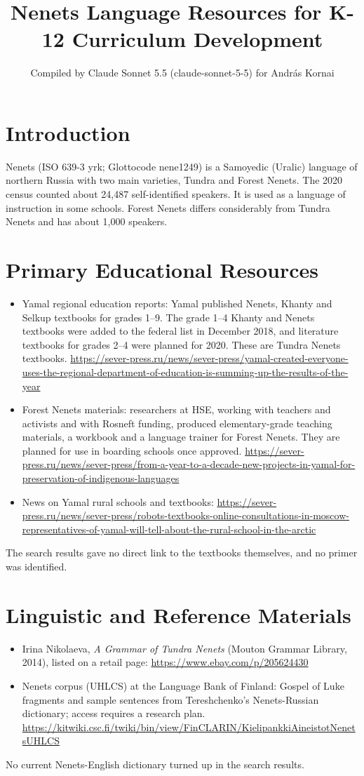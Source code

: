 \documentclass[12pt]{article}
\title{Nenets Language Resources for K-12 Curriculum Development}
\author{Compiled by Claude Sonnet 5.5 (claude-sonnet-5-5) for Andr\'as Kornai}
\date{}
\begin{document}
\maketitle

\section{Introduction}
Nenets (ISO 639-3 yrk; Glottocode nene1249) is a Samoyedic (Uralic) language of northern Russia with two main varieties, Tundra and Forest Nenets. The 2020 census counted about 24,487 self-identified speakers. It is used as a language of instruction in some schools. Forest Nenets differs considerably from Tundra Nenets and has about 1,000 speakers.

\section{Primary Educational Resources}
\begin{itemize}
\item Yamal regional education reports: Yamal published Nenets, Khanty and Selkup textbooks for grades 1--9. The grade 1--4 Khanty and Nenets textbooks were added to the federal list in December 2018, and literature textbooks for grades 2--4 were planned for 2020. These are Tundra Nenets textbooks. \url{https://sever-press.ru/news/sever-press/yamal-created-everyone-uses-the-regional-department-of-education-is-summing-up-the-results-of-the-year}
\item Forest Nenets materials: researchers at HSE, working with teachers and activists and with Rosneft funding, produced elementary-grade teaching materials, a workbook and a language trainer for Forest Nenets. They are planned for use in boarding schools once approved. \url{https://sever-press.ru/news/sever-press/from-a-year-to-a-decade-new-projects-in-yamal-for-preservation-of-indigenous-languages}
\item News on Yamal rural schools and textbooks: \url{https://sever-press.ru/news/sever-press/robots-textbooks-online-consultations-in-moscow-representatives-of-yamal-will-tell-about-the-rural-school-in-the-arctic}
\end{itemize}
The search results gave no direct link to the textbooks themselves, and no primer was identified.

\section{Linguistic and Reference Materials}
\begin{itemize}
\item Irina Nikolaeva, \emph{A Grammar of Tundra Nenets} (Mouton Grammar Library, 2014), listed on a retail page: \url{https://www.ebay.com/p/205624430}
\item Nenets corpus (UHLCS) at the Language Bank of Finland: Gospel of Luke fragments and sample sentences from Tereshchenko's Nenets-Russian dictionary; access requires a research plan. \url{https://kitwiki.csc.fi/twiki/bin/view/FinCLARIN/KielipankkiAineistotNenetsUHLCS}
\end{itemize}
No current Nenets-English dictionary turned up in the search results.
\end{document}
